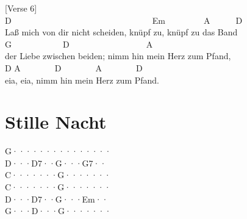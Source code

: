 \documentclass[
  letterpaper,
  twoside=false]{scrbook}
\begin{document}
{[}Verse 6{]}\\
\hspace*{0.333em}\hspace*{0.333em}\hspace*{0.333em}\hspace*{0.333em}\hspace*{0.333em}D~~~~~~~~~~~~~~~~~~~~~~~~~~~~~~~~~Em~~~~~~~~~A~~~~~~D\\
Laß mich von dir nicht scheiden, knüpf zu, knüpf zu das Band\\
\hspace*{0.333em}\hspace*{0.333em}\hspace*{0.333em}\hspace*{0.333em}\hspace*{0.333em}\hspace*{0.333em}\hspace*{0.333em}\hspace*{0.333em}\hspace*{0.333em}\hspace*{0.333em}\hspace*{0.333em}\hspace*{0.333em}\hspace*{0.333em}\hspace*{0.333em}\hspace*{0.333em}\hspace*{0.333em}\hspace*{0.333em}\hspace*{0.333em}\hspace*{0.333em}\hspace*{0.333em}G~~~~~~~~~~~~D~~~~~~~~~~~~~~~~~~A\\
der Liebe zwischen beiden; nimm hin mein Herz zum Pfand,\\
\hspace*{0.333em}\hspace*{0.333em}\hspace*{0.333em}\hspace*{0.333em}\hspace*{0.333em}D
A~~~~~~~~D~~~~~~~~A~~~~~~~~D\\
eia, eia, nimm hin mein Herz zum Pfand.

\hypertarget{stille-nacht}{%
\chapter{Stille Nacht}\label{stille-nacht}}

G···\textbar····\textbar····\textbar····\textbar{}\\
D···\textbar D7··\textbar G···\textbar G7··\textbar{}\\
C···\textbar····\textbar G···\textbar····\textbar{}\\
C···\textbar····\textbar G···\textbar····\textbar{}\\
D···\textbar D7··\textbar G···\textbar Em··\textbar{}\\
G···\textbar D···\textbar G···\textbar····\textbar{}
\end{document}
